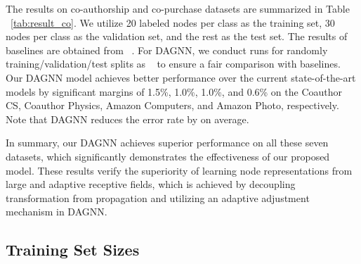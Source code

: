 \documentclass[sigconf]{acmart}
\begin{document}
The results on co-authorship and co-purchase datasets are
summarized in Table ~\ref{tab:result_co}. We utilize 20 labeled
nodes per class as the training set, 30 nodes per class as the
validation set, and the rest as the test set. The results of
baselines are obtained from ~\cite{shchur2018pitfalls}. For DAGNN,
we conduct  runs for randomly training/validation/test
splits as ~\cite{shchur2018pitfalls} to ensure a fair comparison
with baselines. Our DAGNN model achieves better performance over
the current state-of-the-art models by significant margins of
1.5\%, 1.0\%, 1.0\%, and 0.6\% on the Coauthor CS, Coauthor
Physics, Amazon Computers, and Amazon Photo, respectively. Note
that DAGNN reduces the error rate by  on average.

In summary, our DAGNN achieves superior performance on all these
seven datasets, which significantly demonstrates the
effectiveness of our proposed model. These results verify the
superiority of learning node representations from large and
adaptive receptive fields, which is achieved by decoupling
transformation from propagation and utilizing an adaptive
adjustment mechanism in DAGNN.



\subsection{Training Set Sizes}
\end{document}
